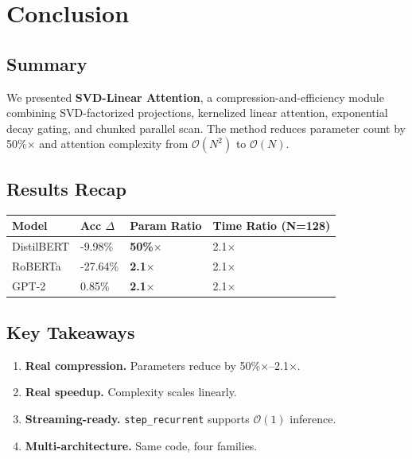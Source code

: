 
\section{Conclusion}

\subsection{Summary}

We presented \textbf{SVD-Linear Attention}, a compression-and-efficiency module 
combining SVD-factorized projections, kernelized linear attention, exponential 
decay gating, and chunked parallel scan. The method reduces parameter count 
by 50\%$\times$ and attention complexity from $\mathcal{O}(N^2)$ to 
$\mathcal{O}(N)$.

\subsection{Results Recap}

\begin{table}[H]
\centering
\small
\begin{tabular}{llll}
\toprule
\textbf{Model} & \textbf{Acc $\Delta$} & \textbf{Param Ratio} & \textbf{Time Ratio (N=128)} \\
\midrule
DistilBERT & -9.98\% & \textbf{50\%$\times$} & 2.1$\times$ \\
RoBERTa & -27.64\% & \textbf{2.1$\times$} & 2.1$\times$ \\
GPT-2 & 0.85\% & \textbf{2.1$\times$} & 2.1$\times$ \\
\bottomrule
\end{tabular}
\end{table}

\subsection{Key Takeaways}

\begin{enumerate}
\item \textbf{Real compression.} Parameters reduce by 50\%$\times$--2.1$\times$.
\item \textbf{Real speedup.} Complexity scales linearly.
\item \textbf{Streaming-ready.} \texttt{step\_recurrent} supports $\mathcal{O}(1)$ inference.
\item \textbf{Multi-architecture.} Same code, four families.

\end{enumerate}
